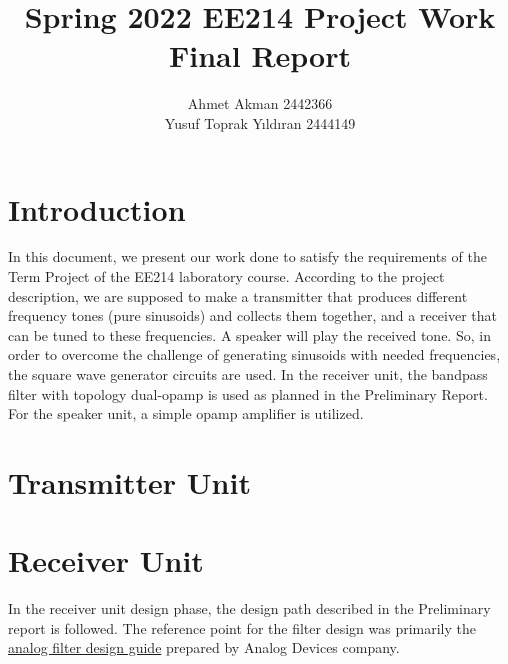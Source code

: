 \documentclass[letterpaper,12pt]{article}
\begin{document}
\thispagestyle{empty}

\title{ \vspace{-2cm} Spring 2022 EE214 Project Work  \protect\\ Final Report\vspace{-4mm}}
\author{ Ahmet Akman 2442366 \protect\\ Yusuf Toprak Yıldıran 2444149 }
\date{}
\maketitle
\section{Introduction}
In this document, we present our work done to satisfy the requirements of the Term Project of the EE214 laboratory course. According to the project description, we are supposed to make a transmitter that produces different frequency tones (pure sinusoids) and collects them together, and a receiver that can be tuned to these frequencies. A speaker will play the received tone.
So, in order to overcome the challenge of generating sinusoids with needed frequencies, the square wave generator circuits are used. In the receiver unit, the bandpass filter with topology dual-opamp is used as planned in the Preliminary Report. For the speaker unit, a simple opamp amplifier is utilized. 

\section{Transmitter Unit}
\section{Receiver Unit}
In the receiver unit design phase, the design path described in the Preliminary report is followed. The reference point for the filter design was primarily the \href{https://www.analog.com/media/en/training-seminars/design-handbooks/basic-linear-design/chapter8.pdf}{analog filter design guide} prepared by Analog Devices company.
\end{document}
